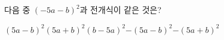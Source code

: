 다음 중 $(-5a-b)^2$과 전개식이 같은 것은?
\begin{choicesii}{$(5a-b)^2$}{$(5a+b)^2$}{$(b-5a)^2$}{$-(5a-b)^2$}{$-(5a+b)^2$}\end{choicesii}
